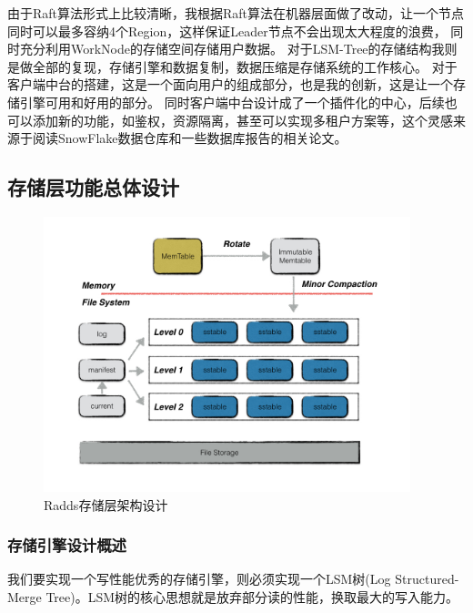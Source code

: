 \begin{enumerate}
			由于Raft算法形式上比较清晰，我根据Raft算法在机器层面做了改动，让一个节点同时可以最多容纳4个Region，这样保证Leader节点不会出现太大程度的浪费，
			同时充分利用WorkNode的存储空间存储用户数据。
			对于LSM-Tree的存储结构我则是做全部的复现，存储引擎和数据复制，数据压缩是存储系统的工作核心。
			对于客户端中台的搭建，这是一个面向用户的组成部分，也是我的创新，这是让一个存储引擎可用和好用的部分。
			同时客户端中台设计成了一个插件化的中心，后续也可以添加新的功能，如鉴权，资源隔离，甚至可以实现多租户方案等，这个灵感来源于阅读SnowFlake数据仓库和一些数据库报告的相关论文。
	
		\end{enumerate}
		

		  
	\subsection{存储层功能总体设计}
			
	\begin{figure}[H]
		\centering
		\includegraphics[width=0.95\textwidth]{images/radds_storage_arch.jpeg}
		\caption{Radds存储层架构设计}
		\label{mobile_overall_design}
	\end{figure}


		\subsubsection{存储引擎设计概述}
		
		我们要实现一个写性能优秀的存储引擎，则必须实现一个LSM树(Log Structured-Merge Tree)。LSM树的核心思想就是放弃部分读的性能，换取最大的写入能力。


